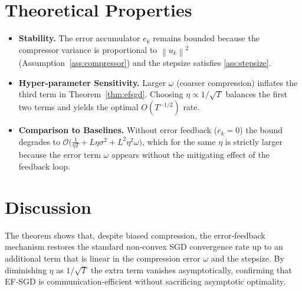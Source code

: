 \documentclass{article}
\newcommand{\norm}[1]{\left\lVert#1\right\rVert}
\begin{document}
\section*{Theoretical Properties}
\begin{itemize}
\item \textbf{Stability.} The error accumulator $e_{k}$ remains bounded because the compressor variance is proportional to $\norm{u_{k}}^{2}$ (Assumption~\ref{ass:compressor}) and the stepsize satisfies \eqref{ass:stepsize}.
\item \textbf{Hyper‑parameter Sensitivity.} Larger $\omega$ (coarser compression) inflates the third term in Theorem~\ref{thm:efsgd}. Choosing $\eta\propto1/\sqrt{T}$ balances the first two terms and yields the optimal $O(T^{-1/2})$ rate.
\item \textbf{Comparison to Baselines.} Without error feedback ($e_{k}=0$) the bound degrades to $\mathcal{O}\big(\frac{1}{\eta T}+L\eta\sigma^{2}+L^{2}\eta^{2}\omega\big)$, which for the same $\eta$ is strictly larger because the error term $\omega$ appears without the mitigating effect of the feedback loop.
\end{itemize}

\section*{Discussion}
The theorem shows that, despite biased compression, the error‑feedback mechanism restores the standard non‑convex SGD convergence rate up to an additional term that is linear in the compression error $\omega$ and the stepsize. By diminishing $\eta$ as $1/\sqrt{T}$ the extra term vanishes asymptotically, confirming that EF‑SGD is communication‑efficient without sacrificing asymptotic optimality.

\newpage
\end{document}
